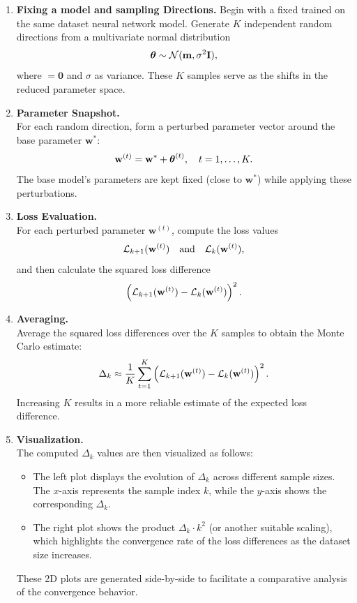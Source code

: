 \documentclass{article}
\begin{document}
\begin{enumerate}
  \item \textbf{Fixing a model and sampling Directions.}
        Begin with a fixed trained on the same dataset neural network model. Generate $K$ independent random directions from a
        multivariate normal distribution
        $$\boldsymbol{\theta} \sim \mathcal{N}(\mathbf{m}, \sigma^2 \mathbf{I}),$$
        where $\bm = \mathbf{0}$ and $\sigma$ as variance. These $K$ samples serve as the shifts in the reduced parameter space.

  \item \textbf{Parameter Snapshot.}\\
        For each random direction, form a perturbed parameter vector around the base parameter $\mathbf{w}^*$:
        $$\mathbf{w}^{(t)} = \mathbf{w}^* + \boldsymbol{\theta}^{(t)}, \quad t=1,\dots,K.$$
        The base model's parameters are kept fixed (close to $\mathbf{w}^*$) while applying these perturbations.

  \item \textbf{Loss Evaluation.}\\
        For each perturbed parameter $\mathbf{w}^{(t)}$, compute the loss values
        $$\mathcal{L}_{k+1}(\mathbf{w}^{(t)}) \quad \text{and} \quad \mathcal{L}_{k}(\mathbf{w}^{(t)}),$$
        and then calculate the squared loss difference
        $$\left( \mathcal{L}_{k+1}(\mathbf{w}^{(t)}) - \mathcal{L}_{k}(\mathbf{w}^{(t)}) \right)^2.$$

  \item \textbf{Averaging.}\\
        Average the squared loss differences over the $K$ samples to obtain the Monte Carlo estimate:
        $$\Delta_k \approx \frac{1}{K} \sum_{t=1}^{K} \left( \mathcal{L}_{k+1}(\mathbf{w}^{(t)}) - \mathcal{L}_{k}(\mathbf{w}^{(t)}) \right)^2.$$
        Increasing $K$ results in a more reliable estimate of the expected loss difference.

  \item \textbf{Visualization.}\\
        The computed $\Delta_k$ values are then visualized as follows:
        \begin{itemize}
          \item The left plot displays the evolution of $\Delta_k$ across different sample sizes. The $x$-axis represents the sample index $k$, while the $y$-axis shows the corresponding $\Delta_k$.
          \item The right plot shows the product $\Delta_k \cdot k^2$ (or another suitable scaling), which highlights the convergence rate of the loss differences as the dataset size increases.
        \end{itemize}
        These 2D plots are generated side-by-side to facilitate a comparative analysis of the convergence behavior.

\end{enumerate}
\end{document}
